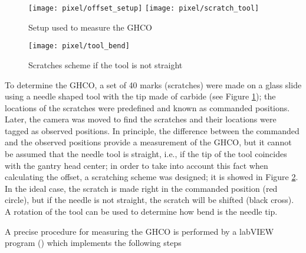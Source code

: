\begin{figure}[h]
\begin{center}
\texttt{[image: pixel/offset\_setup]}
\texttt{[image: pixel/scratch\_tool]}
\caption{Setup used to measure the GHCO}\label{fig:offset_setup}
\end{center}
\end{figure}

\begin{figure}[h]
\begin{center}
\texttt{[image: pixel/tool\_bend]}
\caption{Scratches scheme if the tool is not straight }\label{tool_bend}
\end{center}
\end{figure}

To determine the GHCO, a set of 40 marks (scratches) were made on a glass slide using a needle shaped tool with the tip made of carbide (see Figure \ref{fig:offset_setup}); the locations of the scratches were predefined and known as commanded positions. Later, the camera was moved to find the scratches and their locations were tagged as observed positions. In principle, the difference between the commanded and the observed positions provide a measurement of the GHCO, but it cannot be assumed that the needle tool is straight, i.e., if the tip of the tool coincides with the gantry head center; in order to take into account this fact when calculating the offset, a scratching scheme was designed; it is showed in Figure \ref{tool_bend}. In the ideal case, the scratch is made right in the commanded position (red circle), but if the needle is not straight, the scratch will be shifted (black cross). A rotation of the tool can be used to determine how bend is the needle tip.

A precise procedure for measuring the GHCO is performed by a labVIEW program () which implements the following steps 


